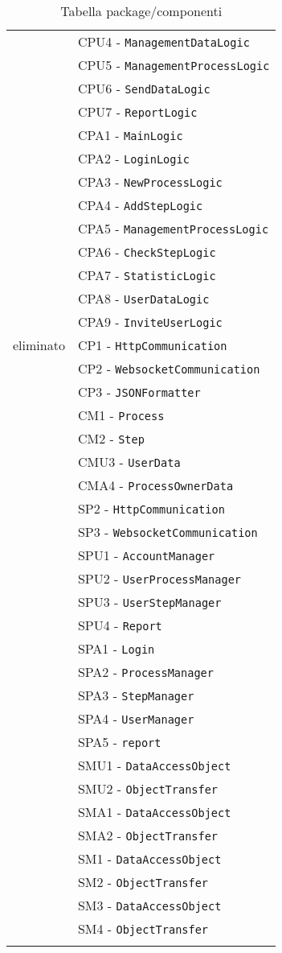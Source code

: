 \begin{longtable}{XX}
&CPU4 - \texttt{ManagementDataLogic}\\
&CPU5 - \texttt{ManagementProcessLogic}\\
&CPU6 - \texttt{SendDataLogic}\\
&CPU7 - \texttt{ReportLogic}\\
\midrule
\logicAdmin{}&CPA1 - \texttt{MainLogic}\\
&CPA2 - \texttt{LoginLogic}\\
&CPA3 - \texttt{NewProcessLogic}\\
&CPA4 - \texttt{AddStepLogic}\\
&CPA5 - \texttt{ManagementProcessLogic}\\
&CPA6 - \texttt{CheckStepLogic}\\
&CPA7 - \texttt{StatisticLogic}\\
&CPA8 - \texttt{UserDataLogic}\\
&CPA9 - \texttt{InviteUserLogic}\\
\midrule
eliminato&CP1 - \texttt{HttpCommunication}\\
&CP2 - \texttt{WebsocketCommunication}\\
&CP3 - \texttt{JSONFormatter}\\
\midrule
\model{}&CM1 - \texttt{Process}\\
&CM2 - \texttt{Step}\\
\midrule
\modelUser{}&CMU3 - \texttt{UserData}\\
\midrule
\modelAdmin{}&CMA4 - \texttt{ProcessOwnerData}\\
\midrule
\sCommunication{}&SP2 - \texttt{HttpCommunication}\\
&SP3 - \texttt{WebsocketCommunication}\\
\midrule
\sLogicUser{}&SPU1 - \texttt{AccountManager}\\
&SPU2 - \texttt{UserProcessManager}\\
&SPU3 - \texttt{UserStepManager}\\
&SPU4 - \texttt{Report}\\
\midrule
\sLogicAdmin{}&SPA1 - \texttt{Login}\\
&SPA2 - \texttt{ProcessManager}\\
&SPA3 - \texttt{StepManager}\\
&SPA4 - \texttt{UserManager}\\
&SPA5 - \texttt{report}\\
\midrule
\daoUser{}&SMU1 - \texttt{DataAccessObject}\\
&SMU2 - \texttt{ObjectTransfer}\\
\midrule
\daoAdmin{}&SMA1 - \texttt{DataAccessObject}\\
&SMA2 - \texttt{ObjectTransfer}\\
\midrule
\daoProcess{}&SM1 - \texttt{DataAccessObject}\\
&SM2 - \texttt{ObjectTransfer}\\
\midrule
\daoStep{}&SM3 - \texttt{DataAccessObject}\\
&SM4 - \texttt{ObjectTransfer}\\
\bottomrule
\caption{Tabella package/componenti}
\end{longtable}